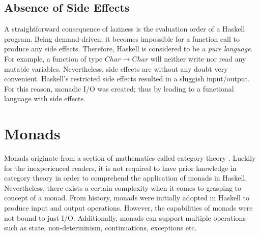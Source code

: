 \documentclass[a4paper, onecolumn]{article}
\begin{document}
    \subsection{Absence of Side Effects}
    
    A straightforward consequence of laziness is the evaluation order of a Haskell program. Being demand-driven, it becomes impossible for a function call to produce any side effects. Therefore, Haskell is considered to be a \textit{pure language}. For example, a function of type $Char \rightarrow Char$ will neither write nor read any mutable variables. Nevertheless, side effects are without any doubt very convenient. Haskell's restricted side effects resulted in a sluggish input/output. For this reason, monadic I/O was created; thus by leading to a functional language with side effects. 
    \section{Monads}
    Monads originate from a section of mathematics called category theory \cite{categorytheory}. Luckily for the inexperienced readers, it is not required to have prior knowledge in category theory in order to comprehend the application of monads in Haskell. 
    Nevertheless, there exists a certain complexity when it comes to grasping to concept of a monad. From history, monads were initially adopted in Haskell to produce input and output operations. However, the capabilities of monads were not bound to just I/O. Additionally, monads can support multiple operations such as state, non-determinism, continuations, exceptions etc.
\end{document}
